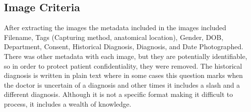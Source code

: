 \subsection{Image Criteria}


After extracting the images the metadata included in the images included Filename, Tags (Capturing method, anatomical location), Gender, DOB, Department, Consent, Historical Diagnosis, Diagnosis, and Date Photographed. There was other metadata with each image, but they are potentially identifiable, so in order to protect patient confidentiality, they were removed. The historical diagnosis is written in plain text where in some cases this question marks when the doctor is uncertain of a diagnosis and other times it includes a slash and a different diagnosis. Although it is not a specific format making it difficult to process, it includes a wealth of knowledge.

